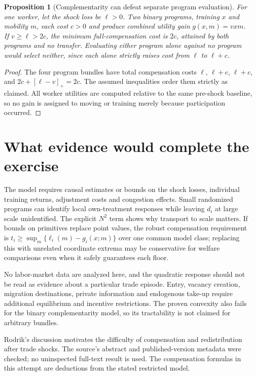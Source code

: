 \documentclass[11pt]{article}
\newtheorem{proposition}[theorem]{Proposition}
\theoremstyle{remark}\newtheorem{remark}[theorem]{Remark}
\begin{document}
\begin{proposition}[Complementarity can defeat separate program evaluation]
For one worker, let the shock loss be $\ell>0$. Two binary programs, training $x$ and mobility $m$, each cost $c>0$ and produce combined utility gain $g(x,m)=vxm$. If $v\ge\ell>2c$, the minimum full-compensation cost is $2c$, attained by both programs and no transfer. Evaluating either program alone against no program would select neither, since each alone strictly raises cost from $\ell$ to $\ell+c$.
\end{proposition}
\begin{proof}
The four program bundles have total compensation costs $\ell$, $\ell+c$, $\ell+c$, and $2c+[\ell-v]_+=2c$. The assumed inequalities order them strictly as claimed. All worker utilities are computed relative to the same pre-shock baseline, so no gain is assigned to moving or training merely because participation occurred.
\end{proof}

\section*{What evidence would complete the exercise}
The model requires causal estimates or bounds on the shock losses, individual training returns, adjustment costs and congestion effects. Small randomized programs can identify local own-treatment responses while leaving $d_i$ at large scale unidentified. The explicit $N^2$ term shows why transport to scale matters. If bounds on primitives replace point values, the robust compensation requirement is $t_i\ge\sup_m\{\ell_i(m)-g_i(x;m)\}$ over one common model class; replacing this with unrelated coordinate extrema may be conservative for welfare comparisons even when it safely guarantees each floor.

No labor-market data are analyzed here, and the quadratic response should not be read as evidence about a particular trade episode. Entry, vacancy creation, migration destinations, private information and endogenous take-up require additional equilibrium and incentive restrictions. The proven convexity also fails for the binary complementarity model, so its tractability is not claimed for arbitrary bundles.

Rodrik's discussion motivates the difficulty of compensation and redistribution after trade shocks. The source's abstract and published-version metadata were checked; no uninspected full-text result is used. The compensation formulas in this attempt are deductions from the stated restricted model.
\end{document}
